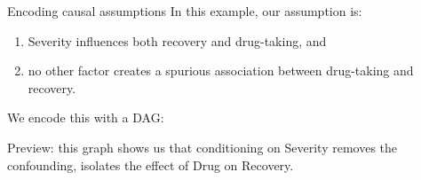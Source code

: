 \documentclass[xcolor=dvipsnames]{beamer}
\begin{document}
\begin{frame}{Encoding causal assumptions}
 In this example, our assumption is:
\footnotesize
\begin{enumerate}
\item Severity influences both recovery and drug-taking, and
\item no other factor creates a spurious association between drug-taking and recovery.
\end{enumerate}
\normalsize
{} We encode this with a DAG:\\
\begin{center}
 \end{center}
\small
{} Preview: this graph  shows us that conditioning on Severity removes the confounding,  isolates the effect of Drug on Recovery. \\
\end{frame}

\end{document}
